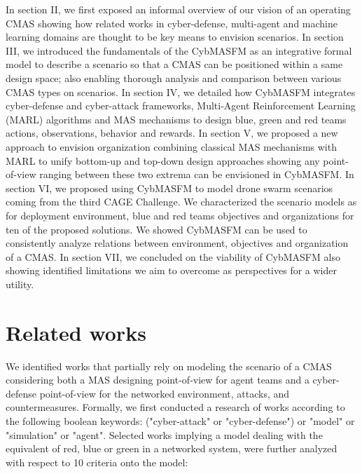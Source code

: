 \documentclass[conference]{IEEEtran}
\begin{document}
In section II, we first exposed an informal overview of our vision of an operating CMAS showing how related works in cyber-defense, multi-agent and machine learning domains are thought to be key means to envision scenarios.
In section III, we introduced the fundamentals of the CybMASFM as an integrative formal model to describe a scenario so that a CMAS can be positioned within a same design space; also enabling thorough analysis and comparison between various CMAS types on scenarios.
In section IV, we detailed how CybMASFM integrates cyber-defense and cyber-attack frameworks, Multi-Agent Reinforcement Learning (MARL) algorithms and MAS mechanisms to design blue, green and red teams actions, observations, behavior and rewards.
In section V, we proposed a new approach to envision organization combining classical MAS mechanisms with MARL to unify bottom-up and top-down design approaches showing any point-of-view ranging between these two extrema can be envisioned in CybMASFM.
In section VI, we proposed using CybMASFM to model drone swarm scenarios coming from the third CAGE Challenge\cite{cage_challenge_3_announcement}. We characterized the scenario models as for deployment environment, blue and red teams objectives and organizations for ten of the proposed solutions. We showed CybMASFM can be used to consistently analyze relations between environment, objectives and organization of a CMAS.
In section VII, we concluded on the viability of CybMASFM also showing identified limitations we aim to overcome as perspectives for a wider utility.


\section{Related works}

We identified works that partially rely on modeling the scenario of a CMAS considering both a MAS designing point-of-view for agent teams and a cyber-defense point-of-view for the networked environment, attacks, and countermeasures. Formally, we first conducted a research of works according to the following boolean keywords: ("cyber-attack" or "cyber-defense") or "model" or "simulation" or "agent". Selected works implying a model dealing with the equivalent of red, blue or green in a networked system, were further analyzed with respect to 10 criteria onto the model:
\end{document}
